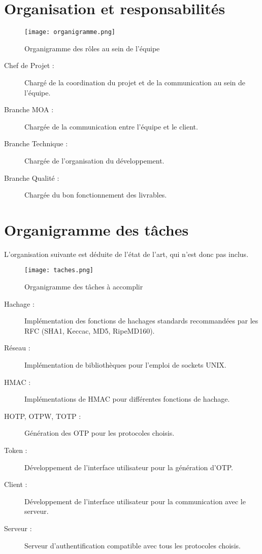 \documentclass{../../res/univ-projet}
\begin{document}
\newpage
\section{Organisation et responsabilités}
	\begin{figure}[h]
	\texttt{[image: organigramme.png]}
	\caption{Organigramme des rôles au sein de l'équipe}
	\end{figure}
	\begin{description}
	\item[Chef de Projet :] Chargé de la coordination du projet et de la communication au sein de l'équipe.
	\item[Branche MOA :] Chargée de la communication entre l'équipe et le client.
	\item[Branche Technique :] Chargée de l'organisation du développement.
	\item[Branche Qualité :] Chargée du bon fonctionnement des livrables. 
	\end{description}
\newpage
\section{Organigramme des t\^aches}
	L'organisation suivante est déduite de l'état de l'art, qui n'est donc pas inclus.
	\begin{figure}[h]
	\texttt{[image: taches.png]}
	\caption{Organigramme des tâches à accomplir}
	\end{figure}
	\begin{description}
	\item[Hachage :]Implémentation des fonctions de hachages standards recommandées par les RFC (SHA1, Keccac, MD5, RipeMD160).
	\item[Réseau :]Implémentation de bibliothèques pour l'emploi de sockets UNIX.
	\item[HMAC :]Implémentations de HMAC pour différentes fonctions de hachage.
	\item[HOTP, OTPW, TOTP :]Génération des OTP pour les protocoles choisis.
	\item[Token :]Développement de l'interface utilisateur pour la génération d'OTP.
	\item[Client :]Développement de l'interface utilisateur pour la communication avec le serveur.
	\item[Serveur :]Serveur d'authentification compatible avec tous les protocoles choisis.
	\end{description}
\newpage
\end{document}
